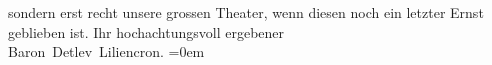 \begin{ledgroupsized}[t]{13cm}
                    sondern erst recht unsere grossen Theater, wenn diesen noch ein letzter Ernst
                    geblieben ist.\pend
           \pstart
           Ihr hochachtungsvoll ergebener{\\[\baselineskip]}\spacefill\mbox{Baron Detlev Liliencron.}\pend
           \leftskip=0em{}          \endnumbering{}\end{ledgroupsized}  \newcommand{\dateiname}{L00321}\newcommand{\titel}{Detlev von Liliencron an Arthur Schnitzler, 7. 5. 1894}\newcommand{\editorInnen}{Martin Anton Müller und Gerd-Hermann Susen}
      
